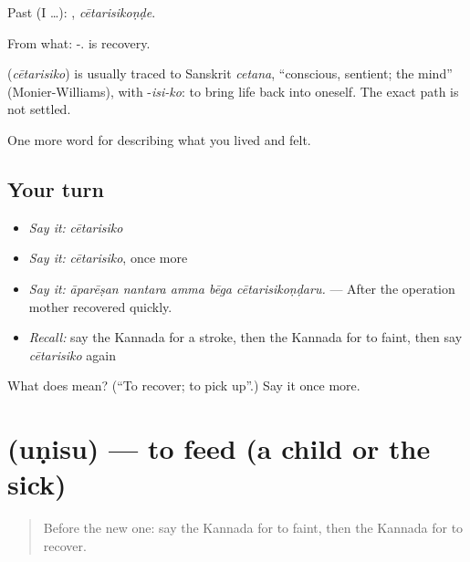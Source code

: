 Past (I …): , \emph{cētarisikoṇḍe}.

From what: -.  is recovery.

\begin{cousinweb}
\textbf{} (\emph{cētarisiko}) is usually traced to Sanskrit \emph{cetana}, \textquotedblleft{}conscious, sentient; the mind\textquotedblright{} (Monier-Williams), with -\emph{isi-ko}: to bring life back into oneself. The exact path is not settled.
\end{cousinweb}

\begin{grammarlens}[title={What you've built}]
One more word for describing what you lived and felt.
\end{grammarlens}

\subsection*{Your turn}
\begin{itemize}
\raggedright
  \item \emph{Say it:} \emph{cētarisiko}
  \item \emph{Say it:} \emph{cētarisiko}, once more
  \item \emph{Say it:} \emph{āparēṣan nantara amma bēga cētarisikoṇḍaru.} — After the operation mother recovered quickly.
  \item \emph{Recall:} say the Kannada for a stroke, then the Kannada for to faint, then say \emph{cētarisiko} again
\end{itemize}

\begin{tcolorbox}[breakable,colback=teal!4,colframe=teal!35!black,title={Before you move on}]
What does  mean? (\textquotedblleft{}To recover; to pick up\textquotedblright{}.) Say it once more.
\end{tcolorbox}
\section[\texorpdfstring{\kn{ಉಣಿಸು} (uṇisu)}{ಉಣಿಸು (uṇisu)}]{ (uṇisu) — to feed (a child or the sick)}

\label{lesson:KA-C513-unisu}



\begin{quote}
Before the new one: say the Kannada for to faint, then the Kannada for to recover.
\end{quote}


